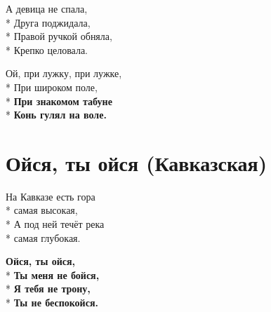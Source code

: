 \medskip

\begin{minipage}{\linewidth}
А девица не спала,\\*
Друга поджидала,\\*
Правой ручкой обняла,\\*
Крепко целовала.\\
\end{minipage}\par\medskip\nobreak

\medskip

\begin{minipage}{\linewidth}
Ой, при лужку, при лужке,\\*
При широком поле,\\*
\textbf{При знакомом табуне}\\*
\textbf{Конь гулял на воле.}\\
\end{minipage}

\vspace{\fill}\newpage

\section{Ойся, ты ойся (Кавказская)}
\label{song:Ойся,_ты_ойся_(Кавказская)}

\medskip

\begin{minipage}{\linewidth}
На Кавказе есть гора\\*
самая высокая,\\*
А под ней течёт река\\*
самая глубокая.\\
\end{minipage}\par\medskip\nobreak

\medskip

\begin{minipage}{\linewidth}
\hspace*{1.5em}\textbf{Ойся, ты ойся,}\\*
\hspace*{1.5em}\textbf{Ты меня не бойся,}\\*
\hspace*{1.5em}\textbf{Я тебя не трону,}\\*
\hspace*{1.5em}\textbf{Ты не беспокойся.}\\
\end{minipage}\par\medskip\nobreak

